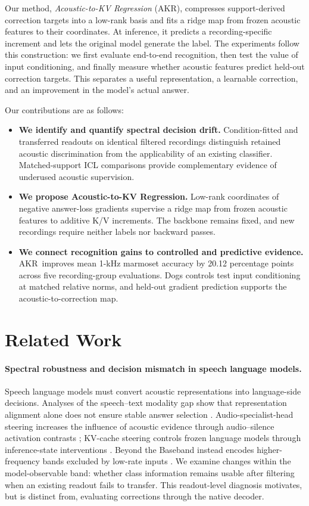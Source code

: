 \documentclass{article}
\newcommand{\method}{AKR}
\begin{document}
Our method, \emph{Acoustic-to-KV Regression} (\method), compresses support-derived correction targets into a low-rank basis and fits a ridge map from frozen acoustic features to their coordinates. At inference, it predicts a recording-specific increment and lets the original model generate the label. The experiments follow this construction: we first evaluate end-to-end recognition, then test the value of input conditioning, and finally measure whether acoustic features predict held-out correction targets. This separates a useful representation, a learnable correction, and an improvement in the model's actual answer.

Our contributions are as follows:
\begin{itemize}
\item \textbf{We identify and quantify spectral decision drift.} Condition-fitted and transferred readouts on identical filtered recordings distinguish retained acoustic discrimination from the applicability of an existing classifier. Matched-support ICL comparisons provide complementary evidence of underused acoustic supervision.
\item \textbf{We propose Acoustic-to-KV Regression.} Low-rank coordinates of negative answer-loss gradients supervise a ridge map from frozen acoustic features to additive K/V increments. The backbone remains fixed, and new recordings require neither labels nor backward passes.
\item \textbf{We connect recognition gains to controlled and predictive evidence.} \method\ improves mean 1-kHz marmoset accuracy by 20.12 percentage points across five recording-group evaluations. Dogs controls test input conditioning at matched relative norms, and held-out gradient prediction supports the acoustic-to-correction map.
\end{itemize}

\section{Related Work}
\paragraph{Spectral robustness and decision mismatch in speech language models.}
Speech language models must convert acoustic representations into language-side decisions. Analyses of the speech--text modality gap show that representation alignment alone does not ensure stable answer selection \citep{hsu2026modality}. Audio-specialist-head steering increases the influence of acoustic evidence through audio--silence activation contrasts \citep{glazer2026heads}; KV-cache steering controls frozen language models through inference-state interventions \citep{belitsky2025kv}. Beyond the Baseband instead encodes higher-frequency bands excluded by low-rate inputs \citep{sarkar2026baseband}. We examine changes within the model-observable band: whether class information remains usable after filtering when an existing readout fails to transfer. This readout-level diagnosis motivates, but is distinct from, evaluating corrections through the native decoder.
\end{document}
